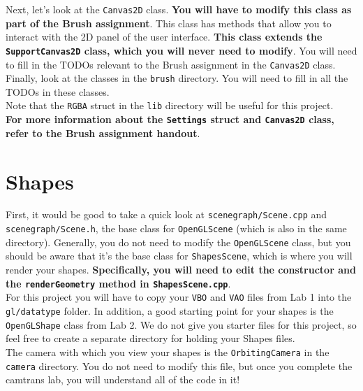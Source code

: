 \documentclass[landscape,twocolumn,letterpaper]{article}
\begin{document}
\noindent
Next, let's look at the \texttt{Canvas2D} class. \textbf{You will have to modify this class as part of the Brush assignment}. This class has methods that allow you to interact with the 2D panel of the user interface. \textbf{This class extends the \texttt{SupportCanvas2D} class, which you will never need to modify}. You will need to fill in the TODOs relevant to the Brush assignment in the \texttt{Canvas2D} class.\\

\noindent
Finally, look at the classes in the \texttt{brush} directory. You will need to fill in all the TODOs in these classes.\\

\noindent
Note that the \texttt{RGBA} struct in the \texttt{lib} directory will be useful for this project. \\

\noindent
\textbf{For more information about the \texttt{Settings} struct and \texttt{Canvas2D} class, refer to the Brush assignment handout}. \\

\section{Shapes}

First, it would be good to take a quick look at \texttt{scenegraph/Scene.cpp} and \texttt{scenegraph/Scene.h}, the base class for \texttt{OpenGLScene} (which is also in the same directory). Generally, you do not need to modify the \texttt{OpenGLScene} class, but you should be aware that it's the base class for \texttt{ShapesScene}, which is where you will render your shapes. \textbf{Specifically, you will need to edit the constructor and the \texttt{renderGeometry} method in \texttt{ShapesScene.cpp}}. \\

\noindent
For this project you will have to copy your \texttt{VBO} and \texttt{VAO} files from Lab 1 into the \texttt{gl/datatype} folder. In addition, a good starting point for your shapes is the \texttt{OpenGLShape} class from Lab 2. We do not give you starter files for this project, so feel free to create a separate directory for holding your Shapes files. \\

\noindent
The camera with which you view your shapes is the \texttt{OrbitingCamera} in the \texttt{camera} directory. You do not need to modify this file, but once you complete the camtrans lab, you will understand all of the code in it! \\
\end{document}
